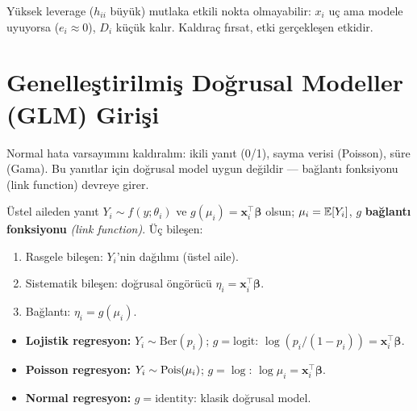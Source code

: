 \begin{ornek}\label{ex:leverage_etki}
Yüksek leverage ($h_{ii}$ büyük) mutlaka etkili nokta olmayabilir: $x_i$ uç ama modele uyuyorsa ($e_i\approx0$), $D_i$ küçük kalır. Kaldıraç fırsat, etki gerçekleşen etkidir.
\end{ornek}

\section{Genelleştirilmiş Doğrusal Modeller (GLM) Girişi}
\label{sec:glm}

\begin{kesif}
Normal hata varsayımını kaldıralım: ikili yanıt (0/1), sayma verisi (Poisson), süre (Gama). Bu yanıtlar için doğrusal model uygun değildir --- bağlantı fonksiyonu (link function) devreye girer.
\end{kesif}

\begin{tanim}[GLM]\label{def:glm}
Üstel aileden yanıt $Y_i\sim f(y;\theta_i)$ ve $g(\mu_i)=\mathbf{x}_i^\top\boldsymbol\beta$ olsun; $\mu_i=\mathbb{E}[Y_i]$, $g$ \textbf{bağlantı fonksiyonu} \emph{(link function)}. Üç bileşen:
\begin{enumerate}
  \item Rasgele bileşen: $Y_i$'nin dağılımı (üstel aile).
  \item Sistematik bileşen: doğrusal öngörücü $\eta_i=\mathbf{x}_i^\top\boldsymbol\beta$.
  \item Bağlantı: $\eta_i=g(\mu_i)$.
\end{enumerate}
\end{tanim}

\begin{ornek}\label{ex:glm_ornekler}
\begin{itemize}
  \item \textbf{Lojistik regresyon:} $Y_i\sim\mathrm{Ber}(p_i)$; $g=\mathrm{logit}$: $\log(p_i/(1-p_i))=\mathbf{x}_i^\top\boldsymbol\beta$.
  \item \textbf{Poisson regresyon:} $Y_i\sim\operatorname{Pois}(\mu_i)$; $g=\log$: $\log\mu_i=\mathbf{x}_i^\top\boldsymbol\beta$.
  \item \textbf{Normal regresyon:} $g=\mathrm{identity}$: klasik doğrusal model.
\end{itemize}
\end{ornek}

